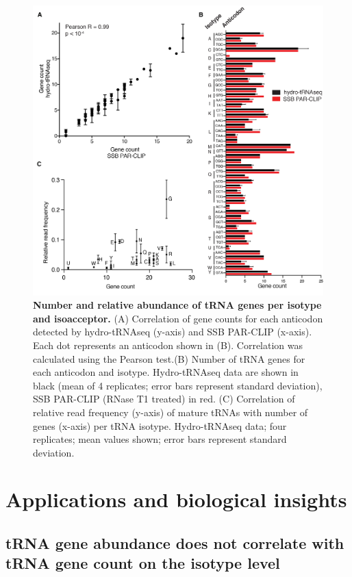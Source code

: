 \documentclass[12pt]{rockefeller}
\begin{document}
\begin{figure}[!h]%
\centering
\includegraphics[width=\textwidth]{paper4.png}%
\caption[Number and relative abundance of tRNA genes per isotype and isoacceptor.]
{\textbf{Number and relative abundance of tRNA genes per isotype and isoacceptor.}
(A) Correlation of gene counts for each anticodon detected by hydro-tRNAseq (y-axis) and SSB PAR-CLIP (x-axis). Each dot represents an anticodon shown in (B). Correlation was calculated using the Pearson test.(B) Number of tRNA genes for each anticodon and isotype. Hydro-tRNAseq data are shown in black (mean of 4 replicates; error bars represent standard deviation), SSB PAR-CLIP (RNase T1 treated) in red. (C) Correlation of relative read frequency (y-axis) of mature tRNAs with number of genes (x-axis) per tRNA isotype. Hydro-tRNAseq data; four replicates; mean values shown; error bars represent standard deviation.}
\centering
\label{paper4}%
\end{figure}

\chapter{Applications and biological insights}\label{applications}

\section{tRNA gene abundance does not correlate with tRNA gene count on the isotype level}
\end{document}
